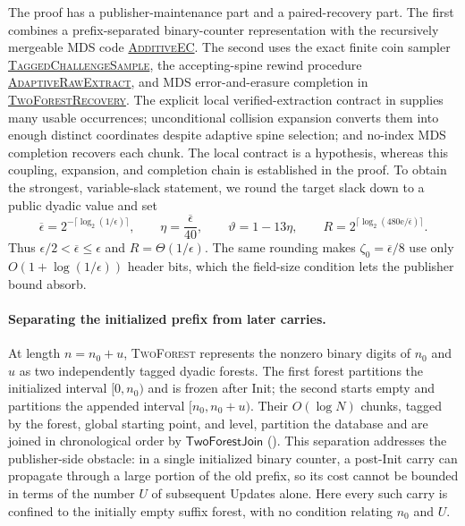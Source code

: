 \documentclass[11pt]{article}
\begin{document}
The proof has a publisher-maintenance part and a paired-recovery part.  The
first combines a prefix-separated binary-counter representation with the
recursively mergeable MDS code
\hyperref[alg:additive]{\textsc{AdditiveEC}}.  The second uses the exact finite
coin sampler \hyperref[alg:challenge-sample]{\textsc{TaggedChallengeSample}},
the accepting-spine rewind procedure
\hyperref[alg:adaptive-raw]{\textsc{AdaptiveRawExtract}}, and MDS
error-and-erasure completion in
\hyperref[alg:recovery]{\textsc{TwoForestRecovery}}.  The explicit local
verified-extraction contract in  supplies many
usable occurrences; unconditional collision expansion converts them into
enough distinct coordinates despite adaptive spine selection; and no-index
MDS completion recovers each chunk.  The local contract is a hypothesis,
whereas this coupling, expansion, and completion chain is established in the
proof.  To obtain the strongest, variable-slack statement, we round the target
slack down to a public dyadic value and set
\[
 \overline\epsilon=2^{-\lceil\log_2(1/\epsilon)\rceil},\qquad
 \eta=\frac{\overline\epsilon}{40},\qquad
 \vartheta=1-13\eta,\qquad
 R=2^{\lceil\log_2(480\mathrm e/\overline\epsilon)\rceil}.
\]
Thus $\epsilon/2<\overline\epsilon\le\epsilon$ and
$R=\Theta(1/\epsilon)$.  The same rounding makes
$\zeta_0=\overline\epsilon/8$ use only
$O(1+\log(1/\epsilon))$ header bits, which the field-size condition lets the
publisher bound absorb.

\paragraph{Separating the initialized prefix from later carries.}
At length $n=n_0+u$, \textsc{TwoForest} represents the nonzero binary digits
of $n_0$ and $u$ as two independently tagged dyadic forests.  The first forest
partitions the initialized interval $[0,n_0)$ and is frozen after Init; the
second starts empty and partitions the appended interval $[n_0,n_0+u)$.
Their $O(\log N)$ chunks, tagged by the forest, global starting point, and
level, partition the database and are joined in chronological order by
$\mathsf{TwoForestJoin}$ ().  This separation
addresses the publisher-side obstacle: in a single initialized binary counter,
a post-Init carry can propagate through a large portion of the old prefix, so
its cost cannot be bounded in terms of the number $U$ of subsequent Updates
alone.  Here every such carry is confined to the initially empty suffix
forest, with no condition relating $n_0$ and $U$.
\end{document}
